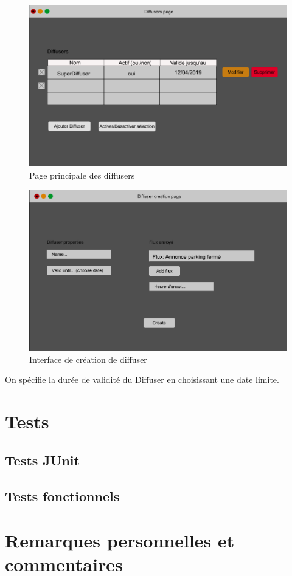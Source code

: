 \documentclass[french]{article}
\begin{document}
	\begin{figure}[h]
		\centering
		\includegraphics[scale=0.4]{mockup/m_diffusers_page}
		\caption{Page principale des diffusers}
		\label{fig:diffuserPage}
	\end{figure}
	
	\begin{figure}[h!]
		\centering
		\includegraphics[scale=0.4]{mockup/m_diffuser_creation}
		\caption{Interface de création de diffuser}
		\label{fig:diffuserCreation}
	\end{figure}
	
	On spécifie la durée de validité du Diffuser en choisissant une date limite. 

	
\section{Tests}

\subsection{Tests JUnit}

\subsection{Tests fonctionnels}

\section{Remarques personnelles et commentaires}
\end{document}
